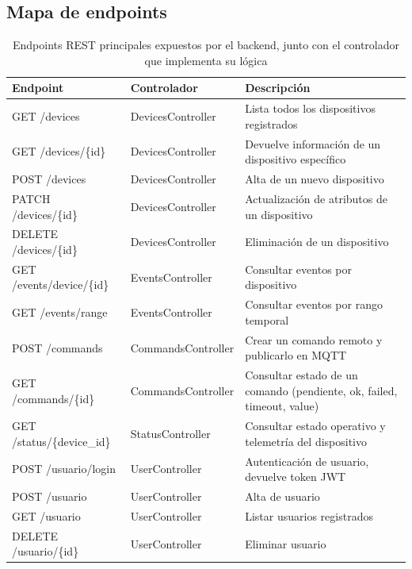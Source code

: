 \subsection{Mapa de endpoints}
\begin{table}[h]
	\centering
	\caption[Endpoints REST principales]{Endpoints REST principales expuestos por el backend, junto con el controlador que implementa su lógica}
	\begin{tabular}{l l p{7cm}}    
		\toprule
		\textbf{Endpoint} & \textbf{Controlador} & \textbf{Descripción} \\
		\midrule
		GET /devices & DevicesController & Lista todos los dispositivos registrados \\
		GET /devices/\{id\} & DevicesController & Devuelve información de un dispositivo específico \\
		POST /devices & DevicesController & Alta de un nuevo dispositivo \\
		PATCH /devices/\{id\} & DevicesController & Actualización de atributos de un dispositivo \\
		DELETE /devices/\{id\} & DevicesController & Eliminación de un dispositivo \\
		\addlinespace
		GET /events/device/\{id\} & EventsController & Consultar eventos por dispositivo \\
		GET /events/range & EventsController & Consultar eventos por rango temporal \\
		\addlinespace
		POST /commands & CommandsController & Crear un comando remoto y publicarlo en MQTT \\
		GET /commands/\{id\} & CommandsController & Consultar estado de un comando (pendiente, ok, failed, timeout, value) \\
		\addlinespace
		GET /status/\{device\_id\} & StatusController & Consultar estado operativo y telemetría del dispositivo \\
		\addlinespace
		POST /usuario/login & UserController & Autenticación de usuario, devuelve token JWT \\
		POST /usuario & UserController & Alta de usuario \\
		GET /usuario & UserController & Listar usuarios registrados \\
		DELETE /usuario/\{id\} & UserController & Eliminar usuario \\
		\bottomrule
		\hline
	\end{tabular}
	\label{tab:endpoints}
\end{table}


